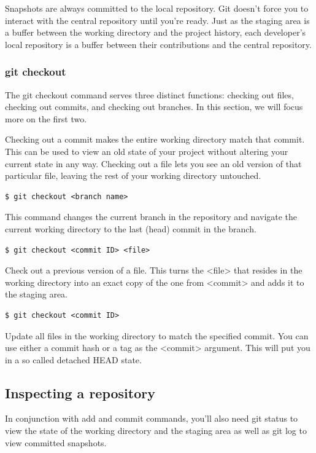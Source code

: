 \documentclass{article}
\begin{document}
Snapshots are always committed to the local repository. Git doesn't
force you to interact with the central repository until you're
ready. Just as the staging area is a buffer between the working
directory and the project history, each developer's local repository
is a buffer between their contributions and the central repository.

\subsubsection*{git checkout}

The git checkout command serves three distinct functions: checking out
files, checking out commits, and checking out branches. In this
section, we will focus more on the first two.

Checking out a commit makes the entire working directory match that
commit. This can be used to view an old state of your project without
altering your current state in any way. Checking out a file lets you
see an old version of that particular file, leaving the rest of your
working directory untouched.

\begin{lstlisting}
$ git checkout <branch name>
\end{lstlisting}

This command changes the current branch in the repository and navigate
the current working directory to the last (head) commit in the branch.

\begin{lstlisting}
$ git checkout <commit ID> <file>
\end{lstlisting}
Check out a previous version of a file. This turns the <file> that
resides in the working directory into an exact copy of the one from
<commit> and adds it to the staging area.

\begin{lstlisting}
$ git checkout <commit ID>
\end{lstlisting}

Update all files in the working directory to match the specified
commit. You can use either a commit hash or a tag as the <commit>
argument. This will put you in a so called detached HEAD state.

\subsection{Inspecting a repository}

In conjunction with add and commit commands, you'll also need git status to
view the state of the working directory and the staging area as well
as git log to view committed snapshots.
\end{document}
